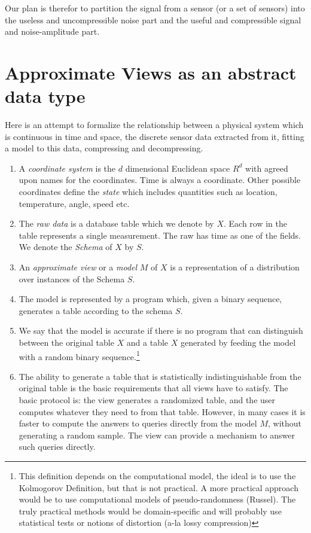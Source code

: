 \documentclass[11pt]{article}
\begin{document}
Our plan is therefor to partition the signal from a sensor (or a set
of sensors) into the useless and uncompressible noise part and the
useful and compressible signal and noise-amplitude part.

\section{Approximate Views as an abstract data type}

Here is an attempt to formalize the relationship between a physical
system which is continuous in time and space, the discrete sensor data
extracted from it, fitting a model to this data, compressing and
decompressing.
\begin{enumerate}
\item A {\em coordinate system} is the $d$ dimensional Euclidean space
  $R^d$ with agreed upon names for the coordinates. Time is always a
  coordinate. Other possible coordinates define the {\em state} which
  includes quantities such as location, temperature, angle, speed etc. 
\item The {\em raw data} is a database table which we denote by
  $X$. Each row in the table represents a single measurement. The raw
  has time as one of the fields. We denote the {\em Schema} of $X$ by $S$.
\item An {\em approximate view} or a {\em model} $M$ of $X$ is a
  representation of a distribution over instances of the Schema $S$.
\item The model is represented by a program which, given a binary
  sequence, generates a table according to the schema $S$.
\item We say that the model is accurate if there is no program that
  can distinguish between the original table $X$ and a table $X$
  generated by feeding the model with a random binary
  sequence.\footnote{This definition depends on the computational
    model, the ideal is to use the Kolmogorov Definition, but that is
    not practical. A more practical approach would be to use
    computational models of pseudo-randomness (Russel). The truly
    practical methods would be domain-specific and will probably use
    statistical tests or notions of distortion (a-la lossy
    compression)}
\item The ability to generate a table that is statistically
  indistinguishable from the original table is the basic requirements
  that all views have to satisfy. The basic protocol is: the view
  generates a randomized table, and the user computes whatever they
  need to from that table. However, in many cases it is faster to
  compute the answers to queries directly from the model $M$, without
  generating a random sample. The view can provide a mechanism to
  answer such queries directly.
\end{enumerate}
\end{document}
